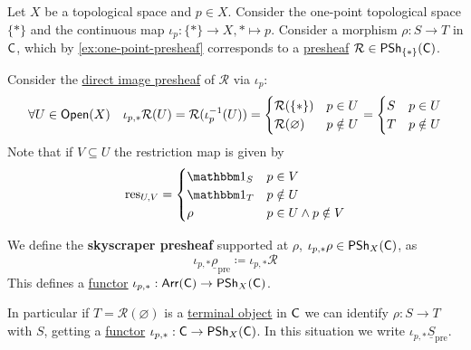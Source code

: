 \documentclass[../../../main]{subfiles}
\begin{document}
\begin{example}\label{ex:skyscraper-presheaf}
  Let \(X\) be a topological space and \(p \in X\).
  Consider the one-point topological space \(\{\ast\}\) and the continuous map \(\iota_{p}: \{\ast\} \to X, \ast \mapsto p\).
  Consider a morphism \(\rho: S \to T\) in \(\mathsf{C}\), which by \autoref{ex:one-point-presheaf} corresponds to a \hyperref[def:presheaf]{presheaf} \(\mathcal{R} \in \mathsf{PSh}_{\{\ast\}}(\mathsf{C})\).

  Consider the \hyperref[def:direct-image-presheaf]{direct image presheaf} of \(\mathcal{R}\) via \(\iota_{p}\):
  \begin{align*}
    \forall U \in \mathsf{Open}(X) \quad \iota_{p, \ast}\mathcal{R}(U) = \mathcal{R}(\iota_{p}^{-1}(U)) = \begin{cases}
      \mathcal{R}(\{\ast\}) & p \in U \\
      \mathcal{R}(\varnothing) & p \notin U
    \end{cases} = \begin{cases}
      S & p \in U \\
      T & p \notin U
    \end{cases}
  \end{align*}
  Note that if \(V \subseteq U\) the restriction map is given by
  \begin{align*}
    \res_{U, V} = \begin{cases}
      \id_{S} & p \in V \\
      \id_{T} & p \notin U \\
      \rho & p \in U \land p \notin V
    \end{cases}
  \end{align*}

  We define the \textbf{skyscraper presheaf} supported at \(\rho\), \(\iota_{p, \ast}\rho \in \mathsf{PSh}_{X}(\mathsf{C})\), as
  \begin{equation}
    \iota_{p, \ast} \underline{\rho}_{\operatorname{pre}} \coloneq \iota_{p, \ast} \mathcal{R}
  \end{equation}
  This defines a \hyperref[def:functor]{functor} \(\iota_{p, \ast}: \mathsf{Arr}(\mathsf{C}) \to \mathsf{PSh}_{X}(\mathsf{C})\).

  In particular if \(T = \mathcal{R}(\varnothing)\) is a \hyperref[def:initial-terminal-object]{terminal object} in \(\mathsf{C}\) we can identify \(\rho: S \to T\) with \(S\), getting a \hyperref[def:functor]{functor} \(\iota_{p, \ast}: \mathsf{C} \to \mathsf{PSh}_{X}(\mathsf{C})\).
  In this situation we write \(\iota_{p, \ast} \underline{S}_{\operatorname{pre}}\).
\end{example}
\end{document}
